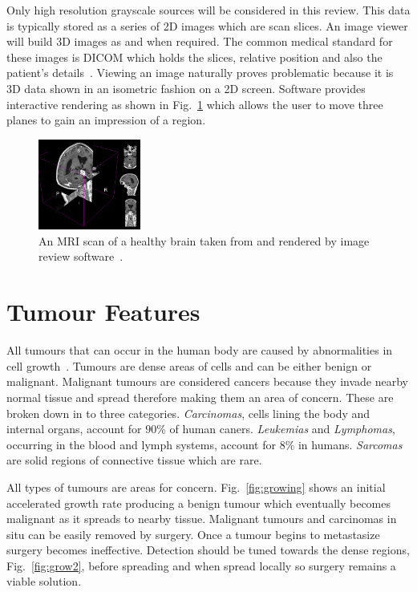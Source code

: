 \documentclass[journal]{IEEEtran}
\begin{document}
Only high resolution grayscale sources will be considered in this review.
This data is typically stored as a series of 2D images which are scan slices.
An image viewer will build 3D images as and when required.
The common medical standard for these images is DICOM which holds the slices, relative position and also the patient's details~\cite{dicom11nema}.
Viewing an image naturally proves problematic because it is 3D data shown in an isometric fashion on a 2D screen.
Software provides interactive rendering as shown in Fig.~\ref{fig:3d} which allows the user to move three planes to gain an impression of a region.

\begin{figure}[!htb]
   \centering
   \includegraphics[width = 0.3\textwidth]{Figures/3Dview.png}
   \caption{An MRI scan of a healthy brain taken from and rendered by image review software~\cite{cia,slicer}.}
   \label{fig:3d}
\end{figure}












\section{Tumour Features}
\label{sec:tumour}

All tumours that can occur in the human body are caused by abnormalities in cell growth~\cite{cooper1992cancer}.
Tumours are dense areas of cells and can be either benign or malignant.
Malignant tumours are considered cancers because they invade nearby normal tissue and spread therefore making them an area of concern.
These are broken down in to three categories.
\emph{Carcinomas}, cells lining the body and internal organs, account for $90$\% of human caners.
\emph{Leukemias} and \emph{Lymphomas}, occurring in the blood and lymph systems, account for $8$\% in humans.
\emph{Sarcomas} are solid regions of connective tissue which are rare.

All types of tumours are areas for concern.
Fig.~\ref{fig:growing} shows an initial accelerated growth rate producing a benign tumour which eventually becomes malignant as it spreads to nearby tissue.
Malignant tumours and carcinomas in situ can be easily removed by surgery.
Once a tumour begins to metastasize surgery becomes ineffective. 
Detection should be tuned towards the dense regions, Fig.~\ref{fig:grow2}, before spreading and when spread locally so surgery remains a viable solution.    
\end{document}
